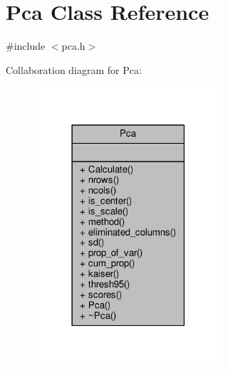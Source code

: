 \hypertarget{classPca}{}\section{Pca Class Reference}
\label{classPca}


{\ttfamily \#include $<$pca.\+h$>$}



Collaboration diagram for Pca\+:
\nopagebreak
\begin{figure}[H]
\begin{center}
\leavevmode
\includegraphics[width=198pt]{classPca__coll__graph}
\end{center}
\end{figure}
